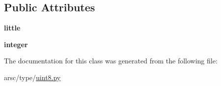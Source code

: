 \subsection*{Public Attributes}
\begin{DoxyCompactItemize}
\item 
\mbox{\label{classarsc_1_1type_1_1uint8_1_1uint8_a12897f8feeadbcff11c1da0d0e0ee26e}} 
{\bfseries little}
\item 
\mbox{\label{classarsc_1_1type_1_1uint8_1_1uint8_a0c2a7653226aa12eebf50e32ab72b443}} 
{\bfseries integer}
\end{DoxyCompactItemize}


The documentation for this class was generated from the following file\+:\begin{DoxyCompactItemize}
\item 
arsc/type/\mbox{\hyperlink{uint8_8py}{uint8.\+py}}\end{DoxyCompactItemize}
